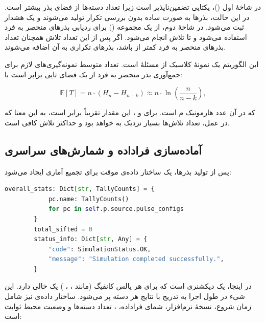 \noindent در شاخۀ اول ()، یکتایی تضمین‌ناپذیر است زیرا تعداد دسته‌ها از فضای بذر بیشتر است. در این حالت، بذرها به صورت ساده بدون بررسی تکرار تولید می‌شوند و یک هشدار ثبت می‌شود. در شاخۀ دوم، از یک مجموعه () برای ردیابی بذرهای منحصر به فرد استفاده می‌شود و تا  تلاش انجام می‌شود. اگر پس از این تعداد تلاش همچنان تعداد بذرهای منحصر به فرد کمتر از  باشد، بذرهای تکراری به آن اضافه می‌شوند.

این الگوریتم یک نمونۀ کلاسیک از مسئلۀ  است. تعداد متوسط نمونه‌گیری‌های لازم برای جمع‌آوری  بذر منحصر به فرد از یک فضای تایی برابر است با:

\begin{equation}
	\mathbb{E}[T] = n \cdot \left( H_n - H_{n-k} \right) \approx n \cdot \ln\!\left( \frac{n}{n-k} \right),
\end{equation}

\noindent که در آن  عدد هارمونیک م است. برای  و ، این مقدار تقریباً برابر  است، به این معنا که در عمل، تعداد تلاش‌ها بسیار نزدیک به  خواهد بود و حداکثر  تلاش کافی است.

\subsection{آماده‌سازی فراداده و شمارش‌های سراسری}

پس از تولید بذرها، یک ساختار داده‌ی موقت برای تجمیع آماری ایجاد می‌شود:

\begin{LTR}
	\begin{lstlisting}[language=Python]
		overall_stats: Dict[str, TallyCounts] = {
			pc.name: TallyCounts()
			for pc in self.p.source.pulse_configs
		}
		total_sifted = 0
		status_info: Dict[str, Any] = {
			"code": SimulationStatus.OK,
			"message": "Simulation completed successfully.",
		}
	\end{lstlisting}
\end{LTR}

\noindent در اینجا،  یک دیکشنری است که برای هر پالس کانفیگ (مانند ، ، ) یک  خالی دارد. این شیء در طول اجرا به تدریج با نتایج هر دسته پر می‌شود. ساختار داده‌ی  نیز شامل زمان شروع، نسخۀ نرم‌افزار، شمای فراداده، ، تعداد دسته‌ها و وضعیت محیط ثوابت است:

